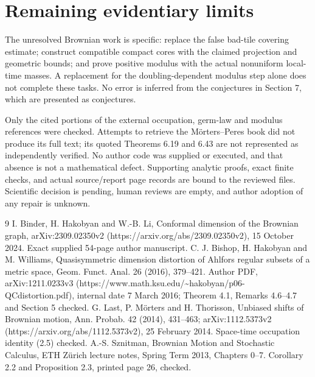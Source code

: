 \documentclass[10pt]{article}
\begin{document}
\section*{Remaining evidentiary limits}
The unresolved Brownian work is specific: replace the false bad-tile covering estimate; construct compatible compact cores with the claimed projection and geometric bounds; and prove positive modulus with the actual nonuniform local-time masses. A replacement for the doubling-dependent modulus step alone does not complete these tasks. No error is inferred from the conjectures in Section 7, which are presented as conjectures.\par
Only the cited portions of the external occupation, germ-law and modulus references were checked. Attempts to retrieve the Mörters–Peres book did not produce its full text; its quoted Theorems 6.19 and 6.43 are not represented as independently verified. No author code was supplied or executed, and that absence is not a mathematical defect. Supporting analytic proofs, exact finite checks, and actual source/report page records are bound to the reviewed files. Scientific decision is pending, human reviews are empty, and author adoption of any repair is unknown.\par
9 I. Binder, H. Hakobyan and W.-B. Li, Conformal dimension of the Brownian graph, arXiv:2309.02350v2 (https://arxiv.org/abs/2309.02350v2), 15 October 2024. Exact supplied 54-page author manuscript. C. J. Bishop, H. Hakobyan and M. Williams, Quasisymmetric dimension distortion of Ahlfors regular subsets of a metric space, Geom. Funct. Anal. 26 (2016), 379–421. Author PDF, arXiv:1211.0233v3 (https://www.math.ksu.edu/\textasciitilde{}hakobyan/p06-QCdistortion.pdf), internal date 7 March 2016; Theorem 4.1, Remarks 4.6–4.7 and Section 5 checked. G. Last, P. Mörters and H. Thorisson, Unbiased shifts of Brownian motion, Ann. Probab. 42 (2014), 431–463; arXiv:1112.5373v2 (https://arxiv.org/abs/1112.5373v2), 25 February 2014. Space-time occupation identity (2.5) checked. A.-S. Sznitman, Brownian Motion and Stochastic Calculus, ETH Zürich lecture notes, Spring Term 2013, Chapters 0–7. Corollary 2.2 and Proposition 2.3, printed page 26, checked.\par
\end{document}

